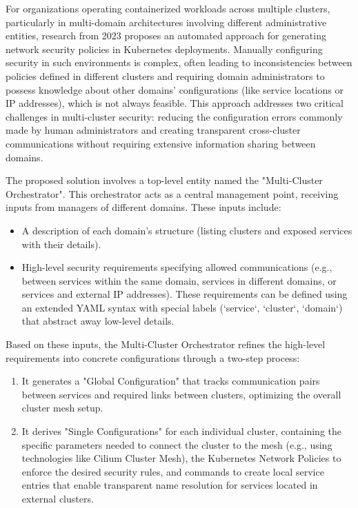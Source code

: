 For organizations operating containerized workloads across multiple clusters, particularly in multi-domain architectures involving different administrative entities, research from 2023 proposes an automated approach for generating network security policies in Kubernetes deployments\cite{bringhenti_security_2023}. Manually configuring security in such environments is complex, often leading to inconsistencies between policies defined in different clusters and requiring domain administrators to possess knowledge about other domains' configurations (like service locations or IP addresses), which is not always feasible\cite{bringhenti_security_2023}. This approach addresses two critical challenges in multi-cluster security: reducing the configuration errors commonly made by human administrators and creating transparent cross-cluster communications without requiring extensive information sharing between domains\cite{bringhenti_security_2023}.

The proposed solution involves a top-level entity named the "Multi-Cluster Orchestrator"\cite{bringhenti_security_2023}. This orchestrator acts as a central management point, receiving inputs from managers of different domains\cite{bringhenti_security_2023}. These inputs include:
\begin{itemize}
    \item A description of each domain's structure (listing clusters and exposed services with their details)\cite{bringhenti_security_2023}.
    \item High-level security requirements specifying allowed communications (e.g., between services within the same domain, services in different domains, or services and external IP addresses)\cite{bringhenti_security_2023}. These requirements can be defined using an extended YAML syntax with special labels (`service`, `cluster`, `domain`) that abstract away low-level details\cite{bringhenti_security_2023}.
\end{itemize}

Based on these inputs, the Multi-Cluster Orchestrator refines the high-level requirements into concrete configurations through a two-step process\cite{bringhenti_security_2023}:
\begin{enumerate}
    \item It generates a "Global Configuration" that tracks communication pairs between services and required links between clusters, optimizing the overall cluster mesh setup\cite{bringhenti_security_2023}.
    \item It derives "Single Configurations" for each individual cluster, containing the specific parameters needed to connect the cluster to the mesh (e.g., using technologies like Cilium Cluster Mesh), the Kubernetes Network Policies to enforce the desired security rules, and commands to create local service entries that enable transparent name resolution for services located in external clusters\cite{bringhenti_security_2023}.
\end{enumerate}

